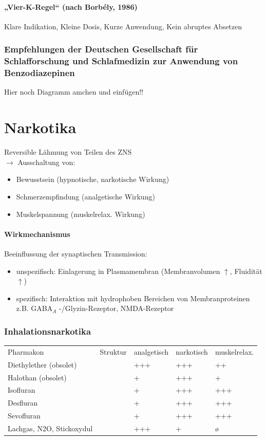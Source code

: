 \documentclass[10pt,a4paper]{report}
\begin{document}
\subsubsection{„Vier-K-Regel“ (nach Borbély, 1986)} %
\label{ssub:_vier_k_regel_nach_borb_ly_1986_}
Klare Indikation, Kleine Dosis, Kurze Anwendung, Kein abruptes Absetzen
\subsection{Empfehlungen der Deutschen Gesellschaft für Schlafforschung und Schlafmedizin zur Anwendung von Benzodiazepinen} %
\label{sub:subsection_name}
Hier noch Diagramm amchen und einfügen!!
\chapter{Narkotika} %
\label{cha:narkotika}
Reversible Lähmung von Teilen des ZNS\\
$\rightarrow$ Ausschaltung von:	
\begin{itemize}
	\item Bewusstsein (hypnotische, narkotische Wirkung)
	\item Schmerzempfindung (analgetische Wirkung)
	\item Muskelspannung (muskelrelax. Wirkung)
\end{itemize}
\subsubsection{Wirkmechanismus} %
\label{ssub:wirkmechanismus}
Beeinflussung der synaptischen Transmission:
\begin{itemize}
	\item unspezifisch: Einlagerung in Plasmamembran (Membranvolumen $\uparrow$, Fluidität  $\uparrow$)
	\item spezifisch: Interaktion mit hydrophoben Bereichen von Membranproteinen z.B. GABA$_A$ -/Glyzin-Rezeptor, NMDA-Rezeptor
\end{itemize}
\subsection{Inhalationsnarkotika} %
\label{sub:inhalationsnarkotika}
\begin{tabularx}{\textwidth}{XXXXX}
Pharmakon&Struktur&analgetisch&narkotisch&muskelrelax.\\
Diethylether (obsolet)&&+++&+++&++\\
Halothan (obsolet)&&+&+++&+\\             
Isofluran&&+&+++&+++\\
Desfluran&&+&+++&+++\\
Sevofluran&&+&+++&+++\\
Lachgas, N2O, Stickoxydul&&+++&+&ø\\
\end{tabularx}
\end{document}
